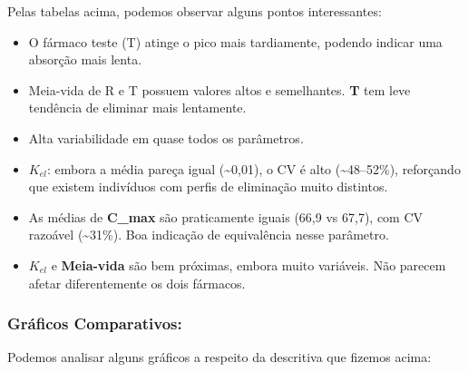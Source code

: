 \documentclass[
]{article}
\begin{document}
Pelas tabelas acima, podemos observar alguns pontos interessantes:

\begin{itemize}
\item
  O fármaco teste (T) atinge o pico mais tardiamente, podendo indicar
  uma absorção mais lenta.
\item
  Meia-vida de R e T possuem valores altos e semelhantes. \textbf{T} tem
  leve tendência de eliminar mais lentamente.
\item
  Alta variabilidade em quase todos os parâmetros.
\item
  \(K_{el}\): embora a média pareça igual (\textasciitilde0,01), o CV é
  alto (\textasciitilde48--52\%), reforçando que existem indivíduos com
  perfis de eliminação muito distintos.
\item
  As médias de \textbf{C\_max} são praticamente iguais (66,9 vs 67,7),
  com CV razoável (\textasciitilde31\%). Boa indicação de equivalência
  nesse parâmetro.
\item
  \(K_{el}\) e \textbf{Meia-vida} são bem próximas, embora muito
  variáveis. Não parecem afetar diferentemente os dois fármacos.
\end{itemize}

\hypertarget{gruxe1ficos-comparativos}{%
\subsubsection{Gráficos Comparativos:}\label{gruxe1ficos-comparativos}}

Podemos analisar alguns gráficos a respeito da descritiva que fizemos
acima:
\end{document}

